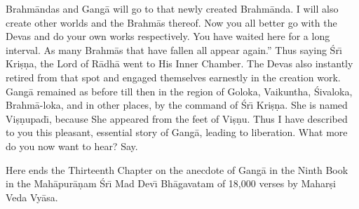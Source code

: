 Brahm\=andas and Gang\=a will go to that newly created Brahm\=anda. I will also create other worlds and the Brahm\=as thereof. Now you all better go with the Devas and do your own works respectively. You have waited here for a long interval. As many Brahm\=as that have fallen all appear again.'' Thus saying \'Sr\={\i} Kri\d{s}\d{n}a, the Lord of R\=adh\=a went to His Inner Chamber. The Devas also instantly retired from that spot and engaged themselves earnestly in the creation work. Gang\=a remained as before till then in the region of Goloka, Vaikuntha, \'Sivaloka, Brahm\=a-loka, and in other places, by the command of \'Sr\={\i} Kri\d{s}\d{n}a. She is named Vi\d{s}\d{n}upad\={\i}, because She appeared from the feet of Vi\d{s}\d{n}u. Thus I have described to you this pleasant, essential story of Gang\=a, leading to liberation. What more do you now want to hear? Say.

Here ends the Thirteenth Chapter on the anecdote of Gang\=a in the Ninth Book in the Mah\=apur\=a\d{n}am \'Sr\={\i} Mad Dev\={\i} Bh\=agavatam of 18,000 verses by Mahar\d{s}i Veda Vy\=asa.



